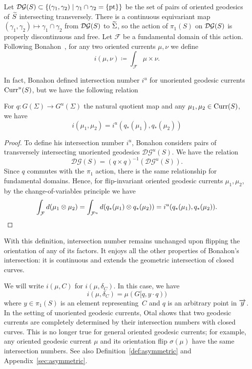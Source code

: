 \begin{definition}
\label{def:intersection_currents}
Let $\operatorname{\mathcal{D}\mathcal{G}}(S) \subset \{ (\gamma_1,\gamma_2) \mid \gamma_1 \cap \gamma_2 = \{ \mbox{pt} \} \}$ be the set of pairs of oriented geodesics of $\widetilde{S}$ intersecting transversely.
There is a continuous equivariant map $(\gamma_1,\gamma_2) \mapsto
\gamma_1 \cap \gamma_2$ from $\operatorname{\mathcal{D}\mathcal{G}}(S)$ to $\widetilde{\Sigma}$,
so the action of $\pi_1(S)$ on $\operatorname{\mathcal{D}\mathcal{G}}(S)$ is properly discontinuous and free. Let
$\mathcal{F}$ be a fundamental domain of this action. Following
Bonahon~\cite{Bonahon86:EndsHyperbolicManifolds}, for any two oriented
currents $\mu, \nu$ we define
\begin{equation}
i(\mu, \nu) \coloneqq \int_{\mathcal{F}} \mu \times \nu.
\label{eq:intersection}
\end{equation}
\end{definition}
In fact, Bonahon defined intersection number $i^u$ for unoriented
geodesic currents $\operatorname{Curr}^u(S)$, but we have the following relation
\begin{lemma}
For $q \colon G(\Sigma) \to G^u(\Sigma)$ the natural quotient map
and any $\mu_1, \mu_2 \in \operatorname{Curr}(S)$, we have
\[
i(\mu_1,\mu_2) = i^u(q_*(\mu_1), q_*(\mu_2))
\]
\end{lemma}
\begin{proof}
To define his intersection number $i^u$, Bonahon considers pairs of transversely intersecting unoriented geodesics $\mathcal{D}\mathcal{G}^u(S)$.
We have the relation
\[
\mathcal{D}\mathcal{G}(S)=(q\times q)^{-1}(\mathcal{D}\mathcal{G}^u(S)).
\]
Since $q$ commutes with the $\pi_1$ action, there is the same
relationship for fundamental domains.
Hence, for flip-invariant oriented geodesic currents $\mu_1, \mu_2$,
by the change-of-variables principle we have
\[
\int_{\mathcal{F}}d(\mu_1 \otimes \mu_2) = \int_{\mathcal{F}^u}d(q_*(\mu_1) \otimes q_*(\mu_2)) = i^u(q_*(\mu_1),q_*(\mu_2)).\qedhere
\]
\end{proof}
With this definition, intersection number remains unchanged upon flipping the
orientation of any of its factors.
It enjoys all the other properties of Bonahon's intersection: it is continuous and extends the geometric intersection of closed curves.


We will write $i(\mu, C)$ for $i(\mu, \delta_C)$.
In this case, we have
\begin{equation}
i(\mu, \delta_C)=\mu(G[q,y \cdot q))
\label{eq:intersection_curve}
\end{equation}
where $y \in \pi_1(S)$ is an element representing~$C$ and $q$ is an
arbitrary point in
$\overrightarrow{y}$.
In the setting of unoriented geodesic currents, Otal
\cite[Th\'eor\`eme~2]{Otal90:SpectreMarqueNegative} shows that two
geodesic currents are completely determined by their intersection
numbers with closed curves.
This is no longer true for general oriented geodesic currents; for example,
any oriented geodesic current $\mu$ and its orientation flip $\sigma(\mu)$ have the same intersection numbers. 
See also Definition~\ref{def:asymmetric} and
Appendix~\ref{sec:asymmetric}.

